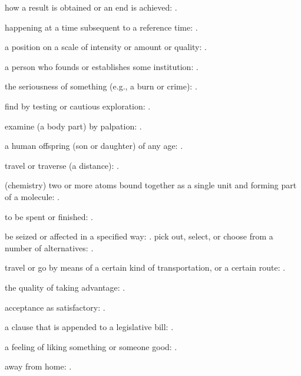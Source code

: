   how a result is obtained or an end is achieved:   .

  happening at a time subsequent to a reference time:   .

  a position on a scale of intensity or amount or quality:   .

  a person who founds or establishes some institution:   .

  the seriousness of something (e.g., a burn or crime): .

  find by testing or cautious exploration: .

  examine (a body part) by palpation:   .

  a human offspring (son or daughter) of any age:   .

  travel or traverse (a distance): .

  (chemistry) two or more atoms bound together as a single unit and forming part of a molecule:   .

  to be spent or finished:   .

  be seized or affected in a specified way: . pick out, select, or choose from a number of alternatives:   .

  travel or go by means of a certain kind of transportation, or a certain route: .

  the quality of taking advantage: .

  acceptance as satisfactory:   .

  a clause that is appended to a legislative bill: .

  a feeling of liking something or someone good: .

  away from home: .

